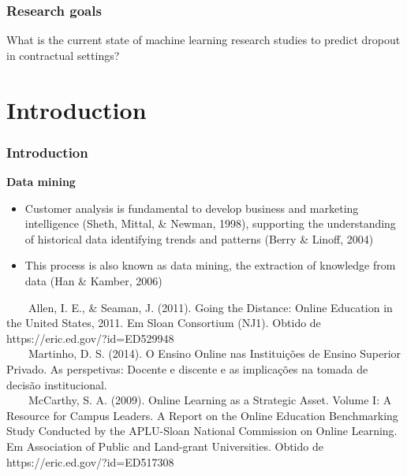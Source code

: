 \documentclass[10pt]{beamer}
\begin{document}
\begin{frame}
	\frametitle{Research goals}
	\Large{What is the current state of machine learning research studies to predict dropout in contractual settings?}

	
\end{frame}

\section{Introduction} %

\begin{frame}
	\frametitle{Introduction}
	\Large
	\textbf{Data mining}\\
		\begin{itemize} \normalsize
			\item Customer analysis is fundamental to develop business and marketing intelligence \footnotesize(Sheth, Mittal, \& Newman, 1998)\normalsize, supporting the understanding of historical data identifying trends and patterns \footnotesize(Berry \& Linoff, 2004)\normalsize
			\item This process is also known as data mining, the extraction of knowledge from data (Han \& Kamber, 2006)

		\end{itemize}	

	
	
	\tiny
	~~~~Allen, I. E., \& Seaman, J. (2011). Going the Distance: Online Education in the United States, 2011. Em Sloan Consortium (NJ1). Obtido de https://eric.ed.gov/?id=ED529948 \\
	~~~~Martinho, D. S. (2014). O Ensino Online nas Instituições de Ensino Superior Privado. As perspetivas: Docente e discente e as implicações na tomada de decisão institucional.\\
	~~~~McCarthy, S. A. (2009). Online Learning as a Strategic Asset. Volume I: A Resource for Campus Leaders. A Report on the Online Education Benchmarking Study Conducted by the APLU-Sloan National Commission on Online Learning. Em Association of Public and Land-grant Universities. Obtido de https://eric.ed.gov/?id=ED517308\\

\end{frame}
\end{document}
